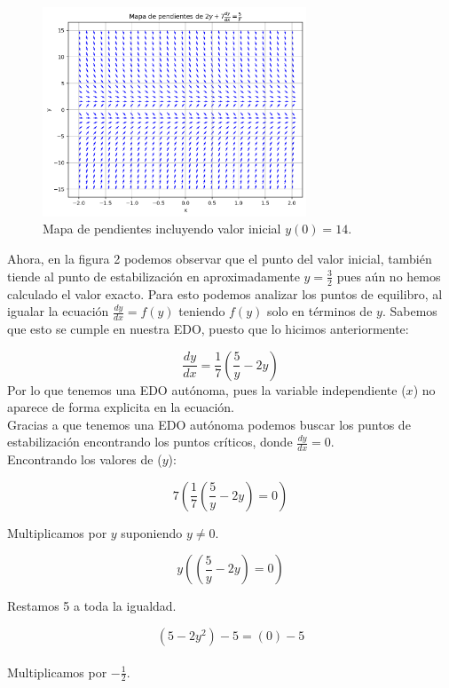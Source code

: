 \documentclass{article}
\begin{document}
\begin{figure}[H]
    \centering
    \includegraphics[width=0.7\textwidth]{MapaDePendientes2.png}
    \caption{Mapa de pendientes incluyendo valor inicial \( y(0) = 14 \).}
    \label{fig:pendientes2}
\end{figure}

Ahora, en la figura 2 podemos observar que el punto del valor inicial, también tiende al punto de estabilización en aproximadamente \(y = \frac{3}{2}\) pues aún no hemos calculado el valor exacto. Para esto podemos analizar los puntos de equilibro, al igualar la ecuación \( \frac{dy}{dx}= f(y) \) teniendo \(f(y)\) solo en términos de \(y\). Sabemos que esto se cumple en nuestra EDO, puesto que lo hicimos anteriormente:

\[
\frac{dy}{dx} = \frac{1}{7} \left( \frac{5}{y} - 2y \right)
\]
Por lo que tenemos una EDO autónoma, pues la variable independiente (\(x\)) no aparece de forma explicita en la ecuación. \\ 
Gracias a que tenemos una EDO autónoma podemos buscar los puntos de estabilización encontrando los puntos críticos, donde \(\frac{dy}{dx}=0\).\\

Encontrando los valores de (\(y\)):

\[
7\left(\frac{1}{7} \left( \frac{5}{y} - 2y \right) = 0\right)
\]

Multiplicamos por \(y\) suponiendo \(y \neq 0\).

\[
y\left(\left( \frac{5}{y} - 2y \right) = 0\right)
\]

Restamos 5 a toda la igualdad.

\[
 (5 - 2y^2)-5  = (0)-5
\] \\ 

Multiplicamos por \(-\frac{1}{2}\).
\end{document}
